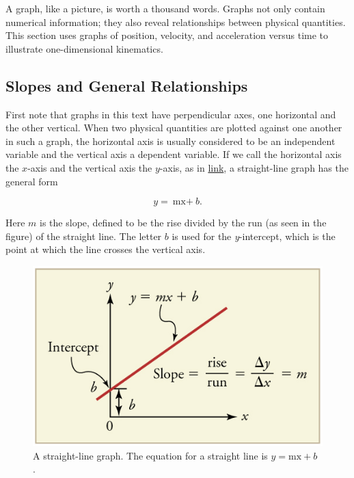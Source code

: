 \documentclass[
]{book}
\begin{document}
A graph, like a picture, is worth a thousand words. Graphs not only
contain numerical information; they also reveal relationships between
physical quantities. This section uses graphs of position, velocity, and
acceleration versus time to illustrate one-dimensional kinematics.

\hypertarget{fs-id1396690}{}
\hypertarget{slopes-and-general-relationships}{%
\subsection{Slopes and General Relationships}\label{slopes-and-general-relationships}}

First note that graphs in this text have perpendicular axes, one
horizontal and the other vertical. When two physical quantities are
plotted against one another in such a graph, the horizontal axis is
usually considered to be an \protect\hypertarget{import-auto-id1690042}{}{independent
variable} and the vertical axis
a \protect\hypertarget{import-auto-id2013112}{}{dependent variable}. If we
call the horizontal axis the \(x{}\)-axis and the vertical axis the
\(y{}\)-axis, as in
\protect\hyperlink{import-auto-id2359358}{link}, a straight-line
graph has the general form

\leavevmode{}%
\[{{{y = {\text{mx} +}}b}.}{}\]

Here \(m{}\) is the \protect\hypertarget{import-auto-id1773074}{}{slope},
defined to be the rise divided by the run (as seen in the figure) of the
straight line. The letter \(b{}\) is used for the
\protect\hypertarget{import-auto-id2955215}{}{\emph{y}-intercept}, which is the
point at which the line crosses the vertical axis.

\begin{figure}
\hypertarget{import-auto-id2359358}{%
\centering
\includegraphics{images/Figure_02_07_01.jpg}
\caption{A straight-line graph. The equation for a straight line is
\({y = {\text{mx} + b}}{}\)
.}\label{import-auto-id2359358}
}
\end{figure}
\end{document}
